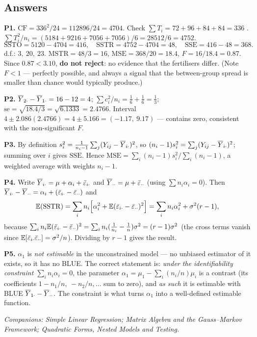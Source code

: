 \documentclass[11pt]{article}
\begin{document}
\subsection*{Answers}

\noindent\textbf{P1.} $\mathrm{CF}=336^2/24=112896/24=4704$. Check
$\sum T_i=72+96+84+84=336$ \checkmark.
$\sum T_i^2/n_i=(5184+9216+7056+7056)/6=28512/6=4752$.
\[
  \mathrm{SSTO}=5120-4704=416,\quad \mathrm{SSTR}=4752-4704=48,\quad \mathrm{SSE}=416-48=368.
\]
d.f.: $3,\ 20,\ 23$. $\mathrm{MSTR}=48/3=16$, $\mathrm{MSE}=368/20=18.4$,
$F=16/18.4=0.87$. Since $0.87<3.10$, \textbf{do not reject}: no evidence that the fertilisers
differ. (Note $F<1$ --- perfectly possible, and always a signal that the between-group
spread is smaller than chance would typically produce.)

\smallskip\noindent\textbf{P2.} $\overline{Y}_{2\cdot}-\overline{Y}_{1\cdot}=16-12=4$;
$\sum c_i^2/n_i=\tfrac16+\tfrac16=\tfrac13$;
$\mathrm{se}=\sqrt{18.4/3}=\sqrt{6.1333}=2.4766$. Interval
$4\pm2.086(2.4766)=4\pm5.166=(-1.17,\ 9.17)$ --- contains zero, consistent with the
non-significant $F$.

\smallskip\noindent\textbf{P3.} By definition
$s_i^2=\frac{1}{n_i-1}\sum_j(Y_{ij}-\overline{Y}_{i\cdot})^2$, so
$(n_i-1)s_i^2=\sum_j(Y_{ij}-\overline{Y}_{i\cdot})^2$; summing over $i$ gives $\mathrm{SSE}$. Hence
$\mathrm{MSE}=\sum_i(n_i-1)s_i^2\big/\sum_i(n_i-1)$, a weighted average with weights
$n_i-1$.

\smallskip\noindent\textbf{P4.} Write $\overline{Y}_{i\cdot}=\mu+\alpha_i+\bar\varepsilon_{i\cdot}$ and
$\overline{Y}_{\cdot\cdot}=\mu+\bar\varepsilon_{\cdot\cdot}$ (using $\sum n_i\alpha_i=0$). Then
$\overline{Y}_{i\cdot}-\overline{Y}_{\cdot\cdot}=\alpha_i+(\bar\varepsilon_{i\cdot}-\bar\varepsilon_{\cdot\cdot})$ and
\[
  \mathbb{E}(\mathrm{SSTR})=\sum_i n_i\Big[\alpha_i^2+\mathbb{E}(\bar\varepsilon_{i\cdot}-\bar\varepsilon_{\cdot\cdot})^2\Big]
  =\sum_i n_i\alpha_i^2+\sigma^2(r-1),
\]
because $\sum_i n_i\mathbb{E}(\bar\varepsilon_{i\cdot}-\bar\varepsilon_{\cdot\cdot})^2
=\sum_i n_i(\tfrac{1}{n_i}-\tfrac1n)\sigma^2=(r-1)\sigma^2$ (the cross terms vanish since
$\mathbb{E}[\bar\varepsilon_{i\cdot}\bar\varepsilon_{\cdot\cdot}]=\sigma^2/n$). Dividing by $r-1$ gives the result.

\smallskip\noindent\textbf{P5.} $\alpha_1$ is \emph{not estimable} in the unconstrained
model --- no unbiased estimator of it exists, so it has no BLUE. The correct statement is:
\emph{under the identifiability constraint $\sum_i n_i\alpha_i=0$}, the parameter
$\alpha_1=\mu_1-\sum_i (n_i/n)\mu_i$ is a contrast (its coefficients
$1-n_1/n,\ -n_2/n,\dots$ sum to zero), and \emph{as such} it is estimable with BLUE
$\overline{Y}_{1\cdot}-\overline{Y}_{\cdot\cdot}$. The constraint is what turns $\alpha_1$ into a
well-defined estimable function.

\vfill
\begin{center}\small\itshape
Companions: Simple Linear Regression; Matrix Algebra and the Gauss--Markov Framework;
Quadratic Forms, Nested Models and Testing.
\end{center}
\end{document}
